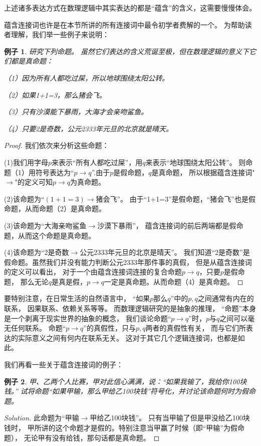 \documentclass[a4paper, 11pt]{article} %
\newtheorem{example}{例子}[subsection]
\begin{document}
上述诸多表达方式在数理逻辑中其实表达的都是“蕴含”的含义，这需要慢慢体会。

蕴含连接词也许是在本节所讲的所有连接词中最令初学者费解的一个。
为帮助读者理解，我们举一些例子来说明：

\begin{example}研究下列命题。
虽然它们表达的含义荒诞至极，但在数理逻辑的意义下它们都是真命题：

（1）因为所有人都吃过屎，所以地球围绕太阳公转。

（2）如果1+1=3，那么猪会飞。

（3）只有沙漠能下暴雨，大海才会亲吻鲨鱼。

（4）只要2是奇数，公元2333年元旦的北京就是晴天。
\end{example}
\begin{proof}
我们依次来分析这些命题：

(1)我们用字母$p$来表示“所有人都吃过屎”，用$q$来表示“地球围绕太阳公转”。
则命题（1）用符号表达为“$p\rightarrow q$”.由于$p$是假命题，$q$是真命题，
所以根据蕴含连接词"$\rightarrow$"的定义可知$p\rightarrow q$为真命题。

(2)该命题为“$(1+1=3)\rightarrow\text{猪会飞}$”。
由于“1+1=3”是假命题，“猪会飞”也是假命题，从而命题（2）是真命题。

(3)该命题为“大海亲吻鲨鱼$\rightarrow$沙漠下暴雨”，
蕴含连接词的前后两端都是假命题，从而这个命题是真命题。

(4)该命题为“2是奇数$\rightarrow$公元2333年元旦的北京是晴天”。
我们知道“2是奇数”是假命题。虽然我们并没有能力判断公元2333年那件事的真假，
但是从蕴含连接词的定义可以看出，
对于一个由蕴含连接词连接的复合命题$p\rightarrow q$，只要$p$是假命题，
那么无论$q$是真是假，$p\rightarrow q$一定是真命题。从而命题（4）是真命题。
\end{proof}

要特别注意，在日常生活的自然语言中，
“如果$p$那么$q$”中的$p,q$之间通常有内在的联系，
因果联系、依赖关系等等。
而数理逻辑研究的是抽象的推理，
“命题”本身是一个剥离于现实世界的抽象的概念，
我们谈论命题“$p\rightarrow q$”时，$p$与$q$之间可以毫无任何联系。
命题“$p\rightarrow q$”的真假性，只与$p,q$两者的真假性有关，
而与它们所表达的实际意义之间有何内在联系无关。
这对于其它几个逻辑连接词，也都是如此。

我们再看一些关于蕴含连接词的例子：

\begin{example}
甲、乙两个人比赛，甲对此信心满满，说：“如果我输了，我给你100块钱。”
试将命题“如果甲输，那么甲给乙100块钱”符号化，并讨论该命题何时为假命题。
\end{example}
\begin{proof}[Solution]
此命题为“甲输$\rightarrow$甲给乙100块钱”。
只有当甲输了但是甲没给乙100块钱时，
甲所讲的这个命题才是假的。特别注意当甲赢了时候（即“甲输”为假命题），
无论甲有没有给钱，那句话都是真命题。
\end{proof}
\end{document}
